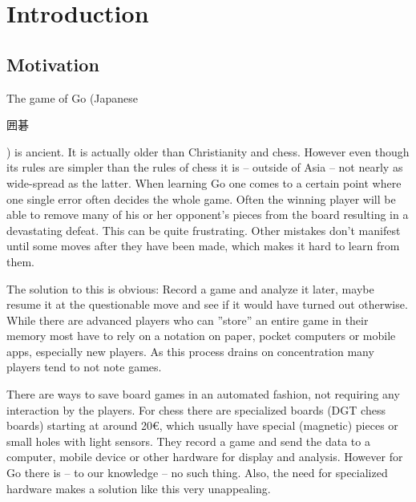 
\chapter{Introduction}
	\section{Motivation}
	\label{introduction-motivation}
	The game of Go (Japanese \begingroup\setmainfont{Droid Sans Japanese}\small\begin{CJK}{UTF8}{min}囲碁\end{CJK}\endgroup ) is ancient. It is actually older than Christianity and chess. However even though its rules are simpler than the rules of chess it is -- outside of Asia -- not nearly as wide-spread as the latter. When learning Go one comes to a certain point where one single error often decides the whole game. Often the winning player will be able to remove many of his or her opponent's pieces from the board resulting in a devastating defeat. This can be quite frustrating. Other mistakes don't manifest until some moves after they have been made, which makes it hard to learn from them.

	The solution to this is obvious: Record a game and analyze it later, maybe resume it at the questionable move and see if it would have turned out otherwise. While there are advanced players who can ''store'' an entire game in their memory most have to rely on a notation on paper, pocket computers or mobile apps, especially new players. As this process drains on concentration many players tend to not note games.

	There are ways to save board games in an automated fashion, not requiring any interaction by the players. For chess there are specialized boards (DGT chess boards) starting at around 20€, which usually have special (magnetic) pieces\cite{bulsink2001device} or small holes with light sensors. They record a game and send the data to a computer, mobile device or other hardware for display and analysis. However for Go there is -- to our knowledge -- no such thing. Also, the need for specialized hardware makes a solution like this very unappealing.

